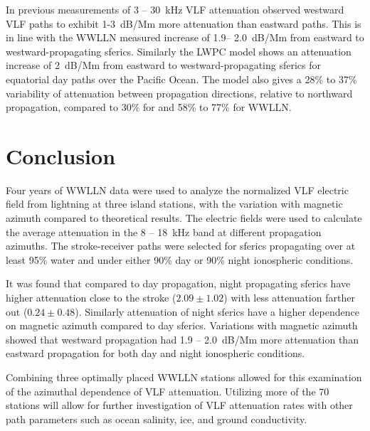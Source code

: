 In previous measurements of 3 -- 30~kHz VLF attenuation \citet{Taylor1960a} observed westward VLF paths to exhibit 1-3~dB/Mm more attenuation than eastward paths.
This is in line with the WWLLN measured increase of 1.9-- 2.0~dB/Mm from eastward to westward-propagating sferics.
Similarly the LWPC model shows an attenuation increase of 2~dB/Mm from eastward to westward-propagating sferics for equatorial day paths over the Pacific Ocean.
The model also gives a 28\% to 37\% variability of attenuation between propagation directions, relative to northward propagation, compared to 30\% for \citet{Wait1960a} and 58\% to 77\% for WWLLN.


\section{Conclusion}

Four years of WWLLN data were used to analyze the normalized VLF electric field from lightning at three island stations, with the variation with magnetic azimuth compared to theoretical results.
The electric fields were used to calculate the average attenuation in the 8 -- 18~kHz band at different propagation azimuths.
The stroke-receiver paths were selected for sferics propagating over at least 95\% water and under either 90\% day or 90\% night ionospheric conditions.

It was found that compared to day propagation, night propagating sferics have higher attenuation close to the stroke ($2.09\pm1.02$) with less attenuation farther out ($0.24\pm0.48$).
Similarly attenuation of night sferics have a higher dependence on magnetic azimuth compared to day sferics.
Variations with magnetic azimuth showed that westward propagation had 1.9 -- 2.0~dB/Mm more attenuation than eastward propagation for both day and night ionospheric conditions.

Combining three optimally placed WWLLN stations allowed for this examination of the azimuthal dependence of VLF attenuation.
Utilizing more of the 70 stations will allow for further investigation of VLF attenuation rates with other path parameters such as ocean salinity, ice, and ground conductivity.
